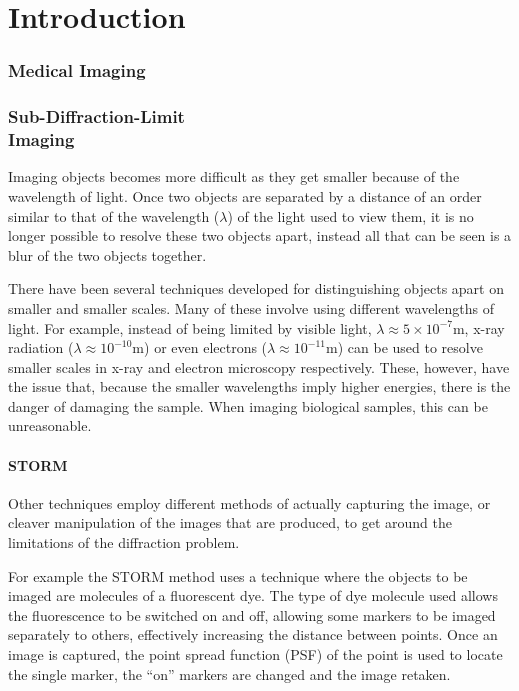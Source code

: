 \part{Introduction}

\section{Medical Imaging}
\label{sec:section_name}

\section[Sub-Diffraction-Limit Imaging]{Sub-Diffraction-Limit\\ Imaging}
\label{sec:sub_diffraction_limit_imaging}

Imaging objects becomes more difficult as they get smaller because of the
wavelength of light. Once two objects are separated by a distance of an order
similar to that of the wavelength ($\lambda$) of the light used to view them,
it is no longer possible to resolve these two objects apart, instead all that
can be seen is a blur of the two objects together.

There have been several techniques developed for distinguishing objects apart
on smaller and smaller scales. Many of these involve using different
wavelengths of light.  For example, instead of being limited by visible light,
$\lambda \approx 5\times 10^{-7} \textrm{m}$, x-ray radiation ($\lambda \approx
10^{-10} \textrm{m}$) or even electrons ($\lambda \approx 10^{-11} \textrm{m}$)
can be used to resolve smaller scales in x-ray and electron microscopy
respectively. These, however, have the issue that, because the smaller
wavelengths imply higher energies, there is the danger of damaging the sample.
When imaging biological samples, this can be unreasonable.

\subsection{STORM}
\label{sub:storm}

Other techniques employ different methods of actually capturing the image, or
cleaver manipulation of the images that are produced, to get around the
limitations of the diffraction problem.

For example the STORM method\cite{rust2006sub} uses a technique where the
objects to be imaged are molecules of a fluorescent dye. The type of dye
molecule used allows the fluorescence to be switched on and off, allowing some
markers to be imaged separately to others, effectively increasing the distance
between points. Once an image is captured, the point spread function (PSF) of
the point is used to locate the single marker, the ``on'' markers are changed
and the image retaken.
